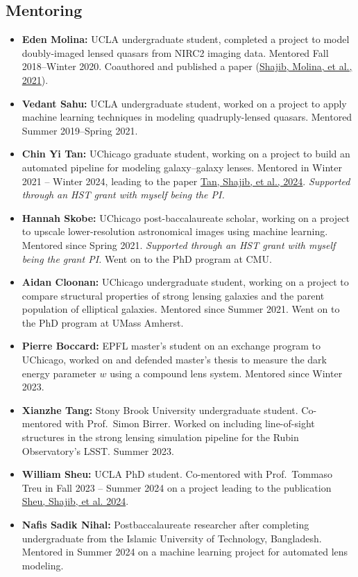 \documentclass[margin, line]{res}
\begin{document}
\begin{resume}
\section{\sc Mentoring}
\begin{itemize}
	\item \textbf{Eden Molina:} UCLA undergraduate student, completed a project to model doubly-imaged lensed quasars from NIRC2 imaging data. Mentored Fall 2018--Winter 2020. Coauthored and published a paper (\href{https://doi:10.1093/mnras/stab532}{Shajib, Molina, et al., 2021}).
	\item \textbf{Vedant Sahu:} UCLA undergraduate student, worked on a project to apply machine learning techniques in modeling quadruply-lensed quasars. Mentored Summer 2019--Spring 2021.
	\item \textbf{Chin Yi Tan:} UChicago graduate student, working on a project to build an automated pipeline for modeling galaxy--galaxy lenses. Mentored in Winter 2021 -- Winter 2024, leading to the paper \href{https://ui.adsabs.harvard.edu/abs/2023arXiv231109307T/abstract}{Tan, Shajib, et al., 2024}. \textit{Supported through an \textsc{HST} grant with myself being the PI.}
	\item \textbf{Hannah Skobe:} UChicago post-baccalaureate scholar, working on a project to upscale lower-resolution astronomical images using machine learning. Mentored since Spring 2021. \textit{Supported through an HST grant with myself being the grant PI.} Went on to the PhD program at CMU.
	\item \textbf{Aidan Cloonan:} UChicago undergraduate student, working on a project to compare structural properties of strong lensing galaxies and the parent population of elliptical galaxies. Mentored since Summer 2021. Went on to the PhD program at UMass Amherst.
	\item \textbf{Pierre Boccard:} EPFL master's student on an exchange program to UChicago, worked on and defended master's thesis to measure the dark energy parameter $w$ using a compound lens system. Mentored since Winter 2023.
	\item \textbf{Xianzhe Tang:} Stony Brook University undergraduate student. Co-mentored with Prof.~Simon Birrer. Worked on including line-of-sight structures in the strong lensing simulation pipeline for the Rubin Observatory's LSST. Summer 2023.
	\item \textbf{William Sheu:} UCLA PhD student. Co-mentored with Prof.~Tommaso Treu in Fall 2023 -- Summer 2024 on a project leading to the publication \href{https://ui.adsabs.harvard.edu/abs/2024arXiv240810316S/abstract}{Sheu, Shajib, et al. 2024}.
	\item \textbf{Nafis Sadik Nihal:} Postbaccalaureate researcher after completing undergraduate from the Islamic University of Technology, Bangladesh. Mentored in Summer 2024 on a machine learning project for automated lens modeling.
\end{itemize}



\end{resume}
\end{document}
